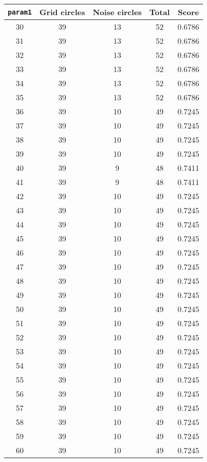 \documentclass[letterpaper, 12pt]{article}
\begin{document}
\begin{longtable}{|c|c|c|c|c|}
\hline
\textbf{\texttt{param1}} & \textbf{Grid circles} & \textbf{Noise circles} & \textbf{Total} & \textbf{Score} \\
\hline
30 & 39 & 13 & 52 & 0.6786 \\
\hline
31 & 39 & 13 & 52 & 0.6786 \\
\hline
32 & 39 & 13 & 52 & 0.6786 \\
\hline
33 & 39 & 13 & 52 & 0.6786 \\
\hline
34 & 39 & 13 & 52 & 0.6786 \\
\hline
35 & 39 & 13 & 52 & 0.6786 \\
\hline
36 & 39 & 10 & 49 & 0.7245 \\
\hline
37 & 39 & 10 & 49 & 0.7245 \\
\hline
38 & 39 & 10 & 49 & 0.7245 \\
\hline
39 & 39 & 10 & 49 & 0.7245 \\
\hline
40 & 39 & 9 & 48 & 0.7411 \\
\hline
41 & 39 & 9 & 48 & 0.7411 \\
\hline
42 & 39 & 10 & 49 & 0.7245 \\
\hline
43 & 39 & 10 & 49 & 0.7245 \\
\hline
44 & 39 & 10 & 49 & 0.7245 \\
\hline
45 & 39 & 10 & 49 & 0.7245 \\
\hline
46 & 39 & 10 & 49 & 0.7245 \\
\hline
47 & 39 & 10 & 49 & 0.7245 \\
\hline
48 & 39 & 10 & 49 & 0.7245 \\
\hline
49 & 39 & 10 & 49 & 0.7245 \\
\hline
50 & 39 & 10 & 49 & 0.7245 \\
\hline
51 & 39 & 10 & 49 & 0.7245 \\
\hline
52 & 39 & 10 & 49 & 0.7245 \\
\hline
53 & 39 & 10 & 49 & 0.7245 \\
\hline
54 & 39 & 10 & 49 & 0.7245 \\
\hline
55 & 39 & 10 & 49 & 0.7245 \\
\hline
56 & 39 & 10 & 49 & 0.7245 \\
\hline
57 & 39 & 10 & 49 & 0.7245 \\
\hline
58 & 39 & 10 & 49 & 0.7245 \\
\hline
59 & 39 & 10 & 49 & 0.7245 \\
\hline
60 & 39 & 10 & 49 & 0.7245 \\

\end{longtable}
\end{document}
